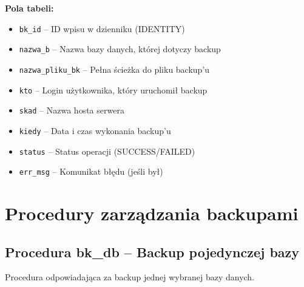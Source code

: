 \documentclass[a4paper,11pt]{article}
\begin{document}
	\textbf{Pola tabeli:}
	\begin{itemize}
		\item \texttt{bk\_id} -- ID wpisu w dzienniku (IDENTITY)
		\item \texttt{nazwa\_b} -- Nazwa bazy danych, której dotyczy backup
		\item \texttt{nazwa\_pliku\_bk} -- Pełna ścieżka do pliku backup'u
		\item \texttt{kto} -- Login użytkownika, który uruchomił backup
		\item \texttt{skad} -- Nazwa hosta serwera
		\item \texttt{kiedy} -- Data i czas wykonania backup'u
		\item \texttt{status} -- Status operacji (SUCCESS/FAILED)
		\item \texttt{err\_msg} -- Komunikat błędu (jeśli był)
	\end{itemize}
	
	\section{Procedury zarządzania backupami}
	
	\subsection{Procedura bk\_db -- Backup pojedynczej bazy}
	
	Procedura odpowiadająca za backup jednej wybranej bazy danych.
	
\end{document}
